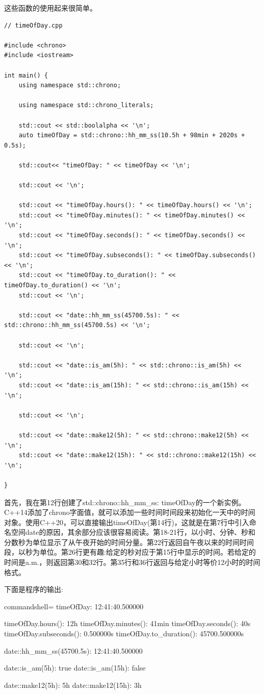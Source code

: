 这些函数的使用起来很简单。

\begin{lstlisting}[style=styleCXX]
// timeOfDay.cpp

#include <chrono>
#include <iostream>

int main() {
	using namespace std::chrono;    
	
	using namespace std::chrono_literals;
	
	std::cout << std::boolalpha << '\n';
	auto timeOfDay = std::chrono::hh_mm_ss(10.5h + 98min + 2020s + 0.5s);
	
	std::cout<< "timeOfDay: " << timeOfDay << '\n';
	
	std::cout << '\n';
	
	std::cout << "timeOfDay.hours(): " << timeOfDay.hours() << '\n';
	std::cout << "timeOfDay.minutes(): " << timeOfDay.minutes() << '\n';
	std::cout << "timeOfDay.seconds(): " << timeOfDay.seconds() << '\n';
	std::cout << "timeOfDay.subseconds(): " << timeOfDay.subseconds() << '\n';
	std::cout << "timeOfDay.to_duration(): " << timeOfDay.to_duration() << '\n';
	std::cout << '\n';
	
	std::cout << "date::hh_mm_ss(45700.5s): " << std::chrono::hh_mm_ss(45700.5s) << '\n';
	
	std::cout << '\n';
	
	std::cout << "date::is_am(5h): " << std::chrono::is_am(5h) << '\n';
	std::cout << "date::is_am(15h): " << std::chrono::is_am(15h) << '\n';
	
	std::cout << '\n';
	
	std::cout << "date::make12(5h): " << std::chrono::make12(5h) << '\n';
	std::cout << "date::make12(15h): " << std::chrono::make12(15h) << '\n';
	
}
\end{lstlisting}

首先，我在第12行创建了std::chrono::hh\_mm\_ss: timeOfDay的一个新实例。C++14添加了chrono字面值，就可以添加一些时间时间段来初始化一天中的时间对象。使用C++20，可以直接输出timeOfDay(第14行)，这就是在第7行中引入命名空间date的原因，其余部分应该很容易阅读。第18-21行，以小时、分钟、秒和分数秒为单位显示了从午夜开始的时间分量。第22行返回自午夜以来的时间时间段，以秒为单位。第26行更有趣:给定的秒对应于第15行中显示的时间。若给定的时间是a.m.，则返回第30和32行。第35行和36行返回与给定小时等价12小时的时间格式。

下面是程序的输出:

\begin{tcblisting}{commandshell={}}
timeOfDay: 12:41:40.500000

timeOfDay.hours(): 12h
timeOfDay.minutes(): 41min
timeOfDay.seconds(): 40s
timeOfDay.subseconds(): 0.500000s
timeOfDay.to_duration(): 45700.500000s

date::hh_mm_ss(45700.5s): 12:41:40.500000

date::is_am(5h): true
date::is_am(15h): false

date::make12(5h): 5h
date::make12(15h): 3h
\end{tcblisting}

